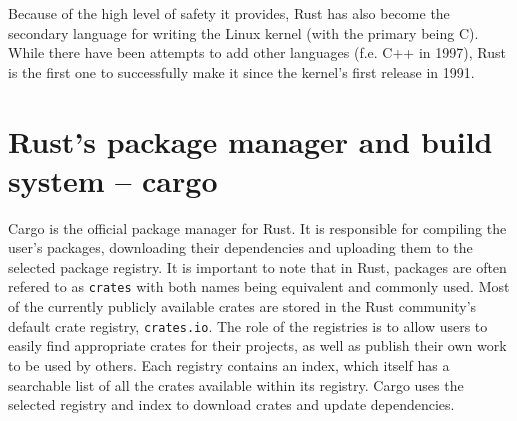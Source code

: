 \documentclass[licencjacka,en]{pracamgr}
\begin{document}
Because of the high level of safety it provides, Rust has also become the secondary
language for writing the Linux kernel (with the primary being C). While there have been
attempts to add other languages (f.e. C++ in 1997), Rust is the first one to successfully
make it since the kernel's first release in 1991.

\section{Rust's package manager and build system -- cargo}

Cargo is the official package manager for Rust. It is responsible for compiling the user's
packages, downloading their dependencies and uploading them to the selected package registry.
It is important to note that in Rust, packages are often refered to as \texttt{crates} with both
names being equivalent and commonly used. Most of the currently publicly available crates are
stored in the Rust community's default crate registry, \texttt{crates.io}. The role of the
registries is to allow users to easily find appropriate crates for their projects, as well as
publish their own work to be used by others. Each registry contains an index, which itself has
a searchable list of all the crates available within its registry. Cargo uses the selected registry
and index to download crates and update dependencies.
\end{document}
